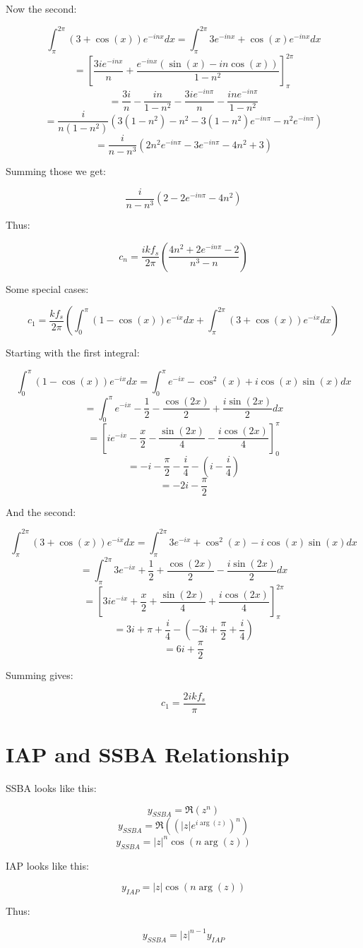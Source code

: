 \documentclass[a4paper]{article}
\begin{document}
	Now the second:

	\[ \int_{\pi}^{2\pi} (3+\cos(x))e^{-inx} dx = \int_{\pi}^{2\pi} 3e^{-inx} + \cos(x)e^{-inx} dx \]
	\[ = \left[ \frac{3ie^{-inx}}{n} + \frac{e^{-inx}(\sin(x) - in\cos(x))}{1 - n^{2}} \right]_{\pi}^{2\pi} \]
	\[ = \frac{3i}{n} - \frac{in}{1 - n^{2}} - \frac{3ie^{-in\pi}}{n} - \frac{ine^{-in\pi}}{1 - n^{2}} \]
	\[ = \frac{i}{n(1-n^{2})} \left( 3(1-n^{2}) - n^{2} - 3(1-n^{2})e^{-in\pi} - n^{2}e^{-in\pi} \right) \]
	\[ = \frac{i}{n - n^{3}} \left( 2n^{2}e^{-in\pi} - 3e^{-in\pi} - 4n^{2} + 3 \right) \]

	Summing those we get:

	\[ \frac{i}{n - n^{3}} \left( 2 - 2e^{-in\pi} - 4n^{2} \right) \]

	Thus:

	\[ c_{n} = \frac{ikf_{s}}{2\pi} \left( \frac{4n^{2} + 2e^{-in\pi} - 2}{n^{3} - n} \right) \]

	Some special cases:

	\[ c_{1} = \frac{kf_{s}}{2\pi} \left( \int_{0}^{\pi} (1-\cos(x))e^{-ix} dx
				              + \int_{\pi}^{2\pi} (3 + \cos(x))e^{-ix} dx 
			                      \right) \]

	Starting with the first integral:
	
	\[ \int_{0}^{\pi} (1-\cos(x))e^{-ix} dx = \int_{0}^{\pi} e^{-ix} - \cos^{2}(x) + i\cos(x)\sin(x) dx \]
	\[ = \int_{0}^{\pi} e^{-ix} - \frac{1}{2} - \frac{\cos(2x)}{2} + \frac{i\sin(2x)}{2} dx \]
	\[ = \left[ ie^{-ix} - \frac{x}{2} - \frac{\sin(2x)}{4} - \frac{i\cos(2x)}{4} \right]_{0}^{\pi} \]
	\[ = -i - \frac{\pi}{2} - \frac{i}{4} - \left( i - \frac{i}{4} \right) \]
	\[ = -2i - \frac{\pi}{2} \]

	And the second:
	
	\[ \int_{\pi}^{2\pi} (3+\cos(x))e^{-ix} dx = \int_{\pi}^{2\pi} 3e^{-ix} + \cos^{2}(x) - i\cos(x)\sin(x) dx \]
	\[ = \int_{\pi}^{2\pi} 3e^{-ix} + \frac{1}{2} + \frac{\cos(2x)}{2} - \frac{i\sin(2x)}{2} dx \]
	\[ = \left[ 3ie^{-ix} + \frac{x}{2} + \frac{\sin(2x)}{4} + \frac{i\cos(2x)}{4} \right]_{\pi}^{2\pi} \]
	\[ = 3i + \pi + \frac{i}{4} - \left( -3i + \frac{\pi}{2} + \frac{i}{4} \right) \]
	\[ = 6i + \frac{\pi}{2} \]

	Summing gives:

	\[ c_{1} = \frac{2ikf_{s}}{\pi} \]

\section{IAP and SSBA Relationship}
	SSBA looks like this:

	\[ y_{SSBA} = \Re \left( z^{n} \right) \]
	\[ y_{SSBA} = \Re \left( (|z|e^{i\arg(z)})^{n} \right) \]
	\[ y_{SSBA} = |z|^{n}\cos(n\arg(z)) \]

	IAP looks like this:

	\[ y_{IAP} = |z|\cos(n\arg(z)) \]

	Thus:

	\[ y_{SSBA} = |z|^{n-1}y_{IAP} \]
\end{document}
